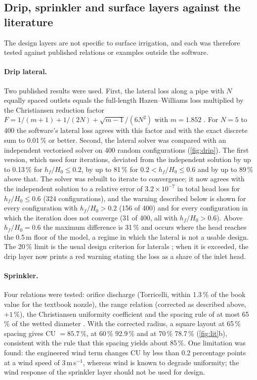\subsection{Drip, sprinkler and surface layers against the literature}
\label{sec:drip}
The design layers are not specific to surface irrigation, and each was therefore tested against published relations or examples outside the software.

\paragraph{Drip lateral.} Two published results were used. First, the lateral loss along a pipe with $N$ equally spaced outlets equals the full-length Hazen--Williams loss multiplied by the Christiansen reduction factor $F=1/(m+1)+1/(2N)+\sqrt{m-1}/(6N^2)$ with $m=1.852$ \citep{Christiansen1942,Keller1990}. For $N=5$ to 400 the software's lateral loss agrees with this factor and with the exact discrete sum to 0.01\,\% or better. Second, the lateral solver was compared with an independent vectorised solver on 400 random configurations (\cref{fig:drip}). The first version, which used four iterations, deviated from the independent solution by up to 0.13\,\% for $h_f/H_0\le0.2$, by up to 81\,\% for $0.2<h_f/H_0\le0.6$ and by up to 89\,\% above that. The solver was rebuilt to iterate to convergence; it now agrees with the independent solution to a relative error of $3.2\times10^{-7}$ in total head loss for $h_f/H_0\le0.6$ (324 configurations), and the warning described below is shown for every configuration with $h_f/H_0>0.2$ (156 of 400) and for every configuration in which the iteration does not converge (31 of 400, all with $h_f/H_0>0.6$). Above $h_f/H_0=0.6$ the maximum difference is 31\,\% and occurs where the head reaches the 0.5\,m floor of the model, a regime in which the lateral is not a usable design. The 20\,\% limit is the usual design criterion for laterals \citep{KellerKarmeli1974,Keller1990}; when it is exceeded, the drip layer now prints a red warning stating the loss as a share of the inlet head.

\paragraph{Sprinkler.} Four relations were tested: orifice discharge (Torricelli, within 1.3\,\% of the book value for the textbook nozzle), the range relation (corrected as described above, $+1$\,\%), the Christiansen uniformity coefficient and the spacing rule of at most 65\,\% of the wetted diameter \citep{Keller1990}. With the corrected radius, a square layout at 65\,\% spacing gives CU $=85.7$\,\%, at 60\,\% 92.9\,\% and at 70\,\% 78.7\,\% (\cref{fig:lit}b), consistent with the rule that this spacing yields about 85\,\%. One limitation was found: the engineered wind term changes CU by less than 0.2 percentage points at a wind speed of 3\,m\,s$^{-1}$, whereas wind is known to degrade uniformity; the wind response of the sprinkler layer should not be used for design.


